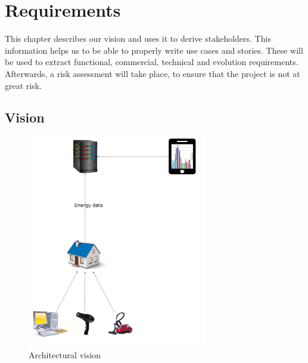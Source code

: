 \chapter{Requirements}
\label{ch:requirements}
This chapter describes our vision and uses it to derive stakeholders. This information helps us to be able to properly write use cases and stories. These will be used to extract functional, commercial, technical and evolution requirements. Afterwards, a risk assessment will take place, to ensure that the project is not at great risk.

\section{Vision}

\begin{figure}[H]
	\centering
	\includegraphics[width=0.7\textwidth]{3-requirements/images/vision.jpg}
	\caption{Architectural vision}
	\label{fig:vision}
\end{figure}

%
















